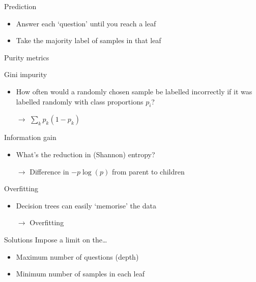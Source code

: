 \begin{frame}{Prediction}
    \begin{itemize}
        \item Answer each `question' until you reach a leaf \\[\bigskipamount]
        \item Take the majority label of samples in that leaf
    \end{itemize}
\end{frame}

\begin{frame}{Purity metrics}
    \begin{block}{Gini impurity}
        \begin{itemize}
            \item How often would a randomly chosen sample be labelled
                  incorrectly if it was labelled randomly with class proportions
                  $p_{i}$?
            \item[$\rightarrow$] $\sum_{k} p_{k} \left( 1 - p_{k} \right)$
        \end{itemize}
    \end{block}
    \vfill
    \begin{block}{Information gain}
        \begin{itemize}
            \item What's the reduction in (Shannon) entropy?
            \item[$\rightarrow$] Difference in $- p \log\!\left( p \right)$ from
                                 parent to children
        \end{itemize}
    \end{block}
\end{frame}

\begin{frame}{Overfitting}
    \begin{itemize}
        \item Decision trees can easily `memorise' the data
        \item[$\rightarrow$] Overfitting
    \end{itemize}
    \vfill\pause
    \begin{block}{Solutions}
        Impose a limit on the\ldots\vspace{-1ex}
        \begin{itemize}
            \item Maximum number of questions (depth)
            \item Minimum number of samples in each leaf
        \end{itemize}
    \end{block}
\end{frame}

